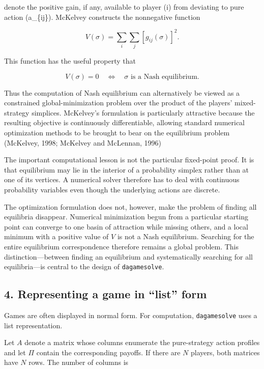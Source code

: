 \documentclass[11pt]{article}
\begin{document}
denote the positive gain, if any, available to player (i) from deviating
to pure action (a\_\{ij\}). McKelvey constructs the nonnegative function

\[
V(\sigma) =\sum_i\sum_j[g_{ij}(\sigma)]^2.
\]

This function has the useful property that

\[
V(\sigma)=0
\quad\Longleftrightarrow\quad
\sigma\text{ is a Nash equilibrium}.
\]

Thus the computation of Nash equilibrium can alternatively be viewed as
a constrained global-minimization problem over the product of the
players' mixed-strategy simplices. McKelvey's formulation is
particularly attractive because the resulting objective is continuously
differentiable, allowing standard numerical optimization methods to be
brought to bear on the equilibrium problem (McKelvey, 1998; McKelvey and
McLennan, 1996)

The important computational lesson is not the particular fixed-point
proof. It is that equilibrium may lie in the interior of a probability
simplex rather than at one of its vertices. A numerical solver therefore
has to deal with continuous probability variables even though the
underlying actions are discrete.

The optimization formulation does not, however, make the problem of
finding all equilibria disappear. Numerical minimization begun from a
particular starting point can converge to one basin of attraction while
missing others, and a local minimum with a positive value of \(V\) is
not a Nash equilibrium. Searching for the entire equilibrium
correspondence therefore remains a global problem. This
distinction---between finding an equilibrium and systematically
searching for all equilibria---is central to the design of
\texttt{dagamesolve}.

    \hypertarget{representing-a-game-in-list-form}{%
\subsection{4. Representing a game in ``list''
form}\label{representing-a-game-in-list-form}}

Games are often displayed in normal form. For computation,
\texttt{dagamesolve} uses a list representation.

Let \(A\) denote a matrix whose columns enumerate the pure-strategy
action profiles and let \(\Pi\) contain the corresponding payoffs. If
there are \(N\) players, both matrices have \(N\) rows. The number of
columns is
\end{document}
